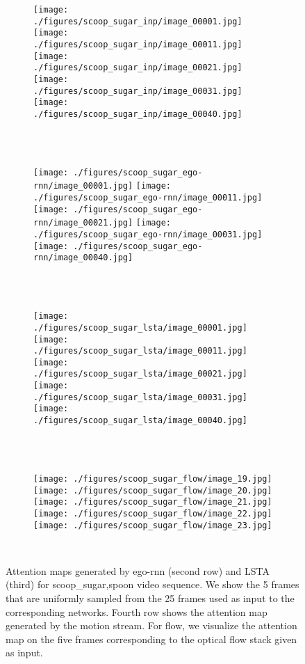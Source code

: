 \documentclass[10pt,twocolumn,letterpaper]{article}
\begin{document}
\begin{figure*}[t]
	\centering      
	\begin{subfigure}[b]{0.95\textwidth}
		\texttt{[image: ./figures/scoop\_sugar\_inp/image\_00001.jpg]}
		\texttt{[image: ./figures/scoop\_sugar\_inp/image\_00011.jpg]}
		\texttt{[image: ./figures/scoop\_sugar\_inp/image\_00021.jpg]}
		\texttt{[image: ./figures/scoop\_sugar\_inp/image\_00031.jpg]}
		\texttt{[image: ./figures/scoop\_sugar\_inp/image\_00040.jpg]}
	\end{subfigure}\\ \vskip 2mm
	\ 
	\begin{subfigure}[b]{0.95\textwidth}
		\texttt{[image: ./figures/scoop\_sugar\_ego-rnn/image\_00001.jpg]}
		\texttt{[image: ./figures/scoop\_sugar\_ego-rnn/image\_00011.jpg]}
		\texttt{[image: ./figures/scoop\_sugar\_ego-rnn/image\_00021.jpg]}
		\texttt{[image: ./figures/scoop\_sugar\_ego-rnn/image\_00031.jpg]}
		\texttt{[image: ./figures/scoop\_sugar\_ego-rnn/image\_00040.jpg]}
	\end{subfigure}\\ \vskip 2mm
	\ 
	\begin{subfigure}[b]{0.95\textwidth}
		\texttt{[image: ./figures/scoop\_sugar\_lsta/image\_00001.jpg]}
		\texttt{[image: ./figures/scoop\_sugar\_lsta/image\_00011.jpg]}
		\texttt{[image: ./figures/scoop\_sugar\_lsta/image\_00021.jpg]}
		\texttt{[image: ./figures/scoop\_sugar\_lsta/image\_00031.jpg]}
		\texttt{[image: ./figures/scoop\_sugar\_lsta/image\_00040.jpg]}
	\end{subfigure}\\ \vskip 2mm	       
	\ 
	\begin{subfigure}[b]{0.95\textwidth}
		\texttt{[image: ./figures/scoop\_sugar\_flow/image\_19.jpg]}
		\texttt{[image: ./figures/scoop\_sugar\_flow/image\_20.jpg]}
		\texttt{[image: ./figures/scoop\_sugar\_flow/image\_21.jpg]}
		\texttt{[image: ./figures/scoop\_sugar\_flow/image\_22.jpg]}
		\texttt{[image: ./figures/scoop\_sugar\_flow/image\_23.jpg]}
	\end{subfigure}\\ \vskip 2mm			 
	\caption{Attention maps generated by ego-rnn (second row) and LSTA (third) for scoop\_sugar,spoon video sequence. We show the 5 frames that are uniformly sampled from the 25 frames used as input to the corresponding networks. Fourth row shows the attention map generated by the motion stream. For flow, we visualize the attention map on the five frames corresponding to the optical flow stack given as input.}
	\label{fig:att_map_scoop_sugar}
\end{figure*}
	
\end{document}
